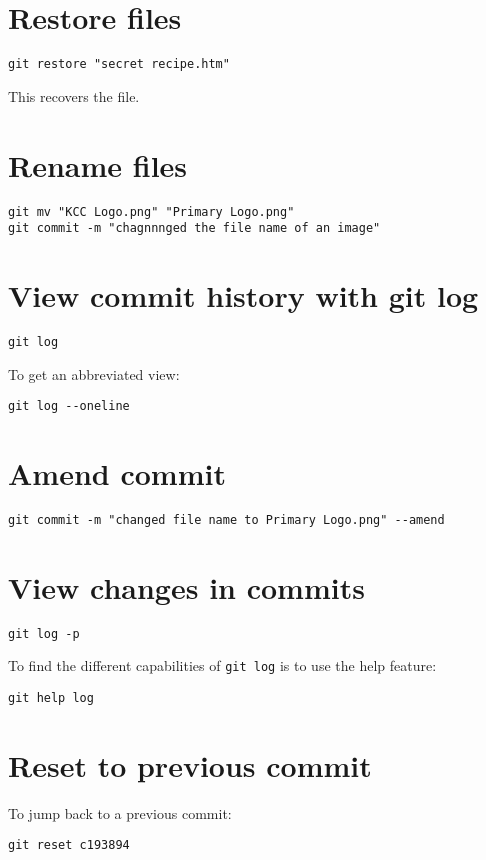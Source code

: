 \documentclass[12pt]{article}
\begin{document}
\section{Restore files}
\begin{Verbatim}
git restore "secret recipe.htm"
\end{Verbatim}
This recovers the file.

\section{Rename files}
\begin{Verbatim}
git mv "KCC Logo.png" "Primary Logo.png"
git commit -m "chagnnnged the file name of an image"
\end{Verbatim}

\section{View commit history with git log}
\begin{Verbatim}
git log
\end{Verbatim}
To get an abbreviated view:
\begin{Verbatim}
git log --oneline
\end{Verbatim}

\section{Amend commit}
\begin{Verbatim}
git commit -m "changed file name to Primary Logo.png" --amend
\end{Verbatim}

\section{View changes in commits}
\begin{Verbatim}
git log -p
\end{Verbatim}
To find the different capabilities of \verb|git log| is to use the help feature:
\begin{Verbatim}
git help log
\end{Verbatim}


\section{Reset to previous commit}
To jump back to a previous commit:
\begin{Verbatim}
git reset c193894
\end{Verbatim}
\end{document}
